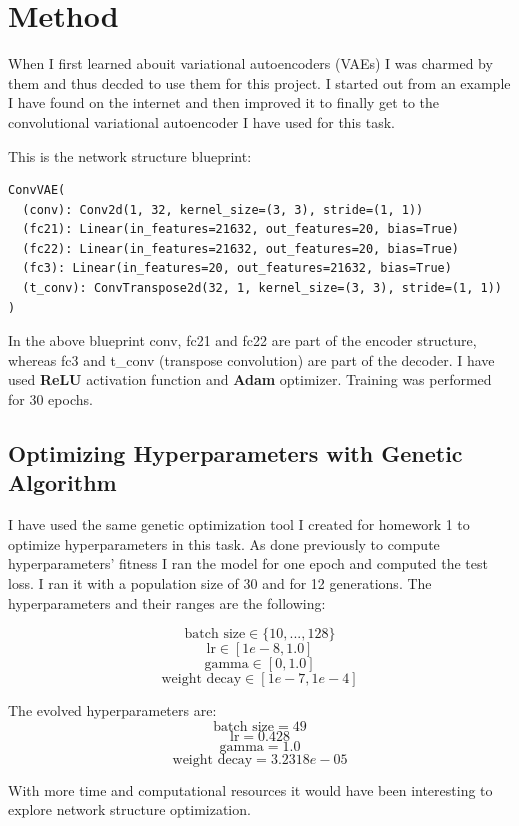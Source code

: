 \documentclass{article}
\begin{document}
\section{Method}

When I first learned abouit variational autoencoders (VAEs) I was charmed by them and thus decded to use them for this project. I started out from an example I have found on the internet and then improved it to finally get to the convolutional variational autoencoder I have used for this task.

This is the network structure blueprint:
\begin{lstlisting}
ConvVAE(
  (conv): Conv2d(1, 32, kernel_size=(3, 3), stride=(1, 1))
  (fc21): Linear(in_features=21632, out_features=20, bias=True)
  (fc22): Linear(in_features=21632, out_features=20, bias=True)
  (fc3): Linear(in_features=20, out_features=21632, bias=True)
  (t_conv): ConvTranspose2d(32, 1, kernel_size=(3, 3), stride=(1, 1))
)
\end{lstlisting}
In the above blueprint conv, fc21 and fc22 are part of the encoder structure, whereas fc3 and t\_conv (transpose convolution) are part of the decoder. 
I have used \textbf{ReLU} activation function and \textbf{Adam} optimizer. Training was performed for 30 epochs.

\subsection{Optimizing Hyperparameters with Genetic Algorithm}
I have used the same genetic optimization tool I created for homework 1 to optimize hyperparameters in this task. As done previously to compute hyperparameters' fitness I ran the model for one epoch and computed the test loss. I ran it with a population size of 30 and for 12 generations. The hyperparameters and their ranges are the following:

$$
\textrm{batch size} \in \{10,...,128\}
$$
$$
\textrm{lr} \in [1e-8, 1.0]
$$
$$
\textrm{gamma} \in [0, 1.0]
$$
$$
\textrm{weight decay} \in [1e-7, 1e-4]
$$

The evolved hyperparameters are:
$$
\textrm{batch size} = 49
$$
$$
\textrm{lr} = 0.428
$$
$$
\textrm{gamma} = 1.0
$$
$$
\textrm{weight decay} = 3.2318e-05
$$

With more time and computational resources it would have been interesting to explore network structure optimization.
\end{document}
